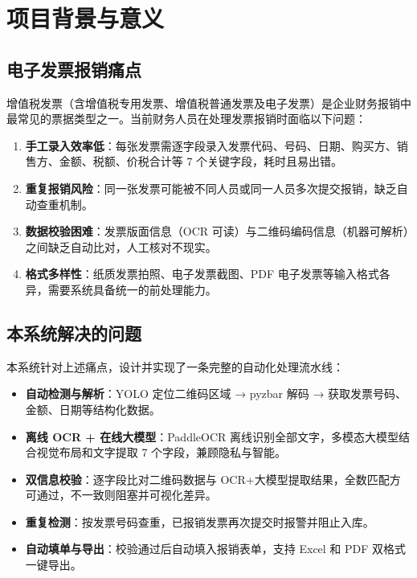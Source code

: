 \documentclass[12pt,a4paper]{ctexart}
\begin{document}
\newpage

\tableofcontents
\newpage

\section{项目背景与意义}

\subsection{电子发票报销痛点}

增值税发票（含增值税专用发票、增值税普通发票及电子发票）是企业财务报销中最常见的票据类型之一。当前财务人员在处理发票报销时面临以下问题：

\begin{enumerate}[label=(\arabic*)]
  \item \textbf{手工录入效率低}：每张发票需逐字段录入发票代码、号码、日期、购买方、销售方、金额、税额、价税合计等 7 个关键字段，耗时且易出错。
  \item \textbf{重复报销风险}：同一张发票可能被不同人员或同一人员多次提交报销，缺乏自动查重机制。
  \item \textbf{数据校验困难}：发票版面信息（OCR 可读）与二维码编码信息（机器可解析）之间缺乏自动比对，人工核对不现实。
  \item \textbf{格式多样性}：纸质发票拍照、电子发票截图、PDF 电子发票等输入格式各异，需要系统具备统一的前处理能力。
\end{enumerate}

\subsection{本系统解决的问题}

本系统针对上述痛点，设计并实现了一条完整的自动化处理流水线：

\begin{itemize}
  \item \textbf{自动检测与解析}：YOLO 定位二维码区域 → pyzbar 解码 → 获取发票号码、金额、日期等结构化数据。
  \item \textbf{离线 OCR + 在线大模型}：PaddleOCR 离线识别全部文字，多模态大模型结合视觉布局和文字提取 7 个字段，兼顾隐私与智能。
  \item \textbf{双信息校验}：逐字段比对二维码数据与 OCR+大模型提取结果，全数匹配方可通过，不一致则阻塞并可视化差异。
  \item \textbf{重复检测}：按发票号码查重，已报销发票再次提交时报警并阻止入库。
  \item \textbf{自动填单与导出}：校验通过后自动填入报销表单，支持 Excel 和 PDF 双格式一键导出。
\end{itemize}
\end{document}
